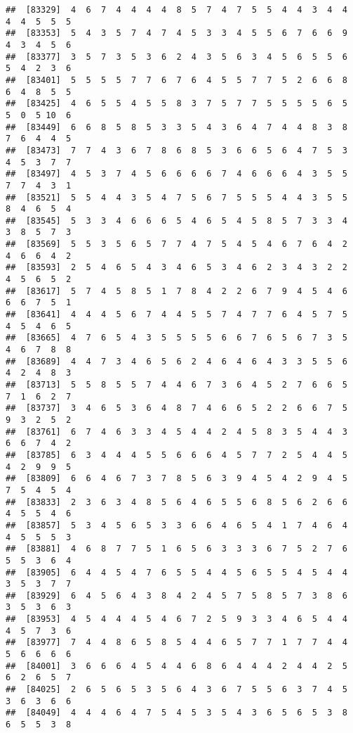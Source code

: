 \documentclass[
]{book}
\begin{document}
\begin{verbatim}
##  [83329]  4  6  7  4  4  4  4  8  5  7  4  7  5  5  4  4  3  4  4  4  4  5  5  5
##  [83353]  5  4  3  5  7  4  7  4  5  3  3  4  5  5  6  7  6  6  9  4  3  4  5  6
##  [83377]  3  5  7  3  5  3  6  2  4  3  5  6  3  4  5  6  5  5  6  5  4  2  3  6
##  [83401]  5  5  5  5  7  7  6  7  6  4  5  5  7  7  5  2  6  6  8  6  4  8  5  5
##  [83425]  4  6  5  5  4  5  5  8  3  7  5  7  7  5  5  5  5  6  5  5  0  5 10  6
##  [83449]  6  6  8  5  8  5  3  3  5  4  3  6  4  7  4  4  8  3  8  7  6  4  4  5
##  [83473]  7  7  4  3  6  7  8  6  8  5  3  6  6  5  6  4  7  5  3  4  5  3  7  7
##  [83497]  4  5  3  7  4  5  6  6  6  6  7  4  6  6  6  4  3  5  5  7  7  4  3  1
##  [83521]  5  5  4  4  3  5  4  7  5  6  7  5  5  5  4  4  3  5  5  8  4  6  5  4
##  [83545]  5  3  3  4  6  6  6  5  4  6  5  4  5  8  5  7  3  3  4  3  8  5  7  3
##  [83569]  5  5  3  5  6  5  7  7  4  7  5  4  5  4  6  7  6  4  2  4  6  6  4  2
##  [83593]  2  5  4  6  5  4  3  4  6  5  3  4  6  2  3  4  3  2  2  4  5  6  5  2
##  [83617]  5  7  4  5  8  5  1  7  8  4  2  2  6  7  9  4  5  4  6  6  6  7  5  1
##  [83641]  4  4  4  5  6  7  4  4  5  5  7  4  7  7  6  4  5  7  5  4  5  4  6  5
##  [83665]  4  7  6  5  4  3  5  5  5  5  6  6  7  6  5  6  7  3  5  4  6  7  8  8
##  [83689]  4  4  7  3  4  6  5  6  2  4  6  4  6  4  3  3  5  5  6  4  2  4  8  3
##  [83713]  5  5  8  5  5  7  4  4  6  7  3  6  4  5  2  7  6  6  5  7  1  6  2  7
##  [83737]  3  4  6  5  3  6  4  8  7  4  6  6  5  2  2  6  6  7  5  9  3  2  5  2
##  [83761]  6  7  4  6  3  3  4  5  4  4  2  4  5  8  3  5  4  4  3  6  6  7  4  2
##  [83785]  6  3  4  4  4  5  5  6  6  6  4  5  7  7  2  5  4  4  5  4  2  9  9  5
##  [83809]  6  6  4  6  7  3  7  8  5  6  3  9  4  5  4  2  9  4  5  7  5  4  5  4
##  [83833]  2  3  6  3  4  8  5  6  4  6  5  5  6  8  5  6  2  6  6  4  5  5  4  6
##  [83857]  5  3  4  5  6  5  3  3  6  6  4  6  5  4  1  7  4  6  4  4  5  5  5  3
##  [83881]  4  6  8  7  7  5  1  6  5  6  3  3  3  6  7  5  2  7  6  5  5  3  6  4
##  [83905]  6  4  4  5  4  7  6  5  5  4  4  5  6  5  5  4  5  4  4  3  5  3  7  7
##  [83929]  6  4  5  6  4  3  8  4  2  4  5  7  5  8  5  7  3  8  6  3  5  3  6  3
##  [83953]  4  5  4  4  4  5  4  6  7  2  5  9  3  3  4  6  5  4  4  4  5  7  3  6
##  [83977]  7  4  4  8  6  5  8  5  4  4  6  5  7  7  1  7  7  4  4  5  6  6  6  6
##  [84001]  3  6  6  6  4  5  4  4  6  8  6  4  4  4  2  4  4  2  5  6  2  6  5  7
##  [84025]  2  6  5  6  5  3  5  6  4  3  6  7  5  5  6  3  7  4  5  3  6  3  6  6
##  [84049]  4  4  4  6  4  7  5  4  5  3  5  4  3  6  5  6  5  3  8  6  5  5  3  8

\end{verbatim}
\end{document}
